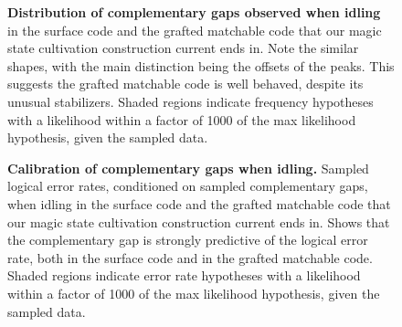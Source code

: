 \documentclass[onecolumn,unpublished,a4paper]{quantumarticle}
\theoremstyle{definition}
\begin{document}
\begin{figure}
    \centering
    \caption{
        \textbf{Distribution of complementary gaps observed when idling} in the surface code and the grafted matchable code that our magic state cultivation construction current ends in.
        Note the similar shapes, with the main distinction being the offsets of the peaks.
        This suggests the grafted matchable code is well behaved, despite its unusual stabilizers.
        Shaded regions indicate frequency hypotheses with a likelihood within a factor of 1000 of the max likelihood hypothesis, given the sampled data.
    }
    \label{fig:gap-distribution}
\end{figure}

\begin{figure}
    \centering
    \begin{adjustwidth}{-2.0cm}{-2.0cm}
    \end{adjustwidth}
    \caption{
        \textbf{Calibration of complementary gaps when idling.}
        Sampled logical error rates, conditioned on sampled complementary gaps, when idling in the surface code and the grafted matchable code that our magic state cultivation construction current ends in.
        Shows that the complementary gap is strongly predictive of the logical error rate, both in the surface code and in the grafted matchable code.
        Shaded regions indicate error rate hypotheses with a likelihood within a factor of 1000 of the max likelihood hypothesis, given the sampled data.
    }
    \label{fig:gap-calibration}
\end{figure}
\end{document}
